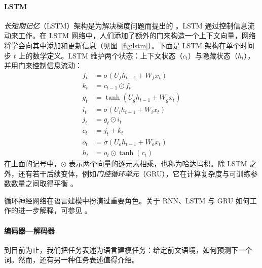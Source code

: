 \paragraph{LSTM} \emph{长短期记忆}（LSTM）架构是为解决梯度问题而提出的 \citep{hochreiter1997long}。LSTM 通过控制信息流动来工作。在 LSTM 网络中，人们添加了额外的门来构造一个上下文向量，网络将学会向其中添加和更新信息（见图~\ref{fig:lstm}）。下面是 LSTM 架构在单个时间步 $t$ 上的数学定义。LSTM 维护两个状态：上下文状态（$c_t$）与隐藏状态（$h_t$），并用门来控制信息流动：
\begin{align*}
    f_t &= \sigma(U_f h_{t-1} + W_f x_t) \\
    k_t &= c_{t-1} \odot f_t \\
    g_t &= \tanh(U_g h_{t-1} + W_g x_t) \\
    i_t &= \sigma(U_i h_{t-1} + W_i x_t) \\
    j_t &= g_t \odot i_t \\
    c_t &= j_t + k_t \\
    o_t &= \sigma(U_o h_{t-1} + W_o x_t) \\
    h_t &= o_t \odot \tanh(c_t)
\end{align*}
%
在上面的记号中，$\odot$ 表示两个向量的逐元素相乘，也称为哈达玛积。除 LSTM 之外，还有若干后续变体，例如\emph{门控循环单元}（GRU），它在计算复杂度与可训练参数数量之间取得平衡 \citep{cho2014gated}。

循环神经网络在语言建模中扮演过重要角色。关于 RNN、LSTM 与 GRU 如何工作的进一步解释，可参见 \citet{olah2015understanding,bishop2023deep,goodfellow2014generative}。


\paragraph{编码器—解码器}
到目前为止，我们把任务表述为语言建模任务：给定前文语境，如何预测下一个词。然而，还有另一种任务表述值得介绍。

